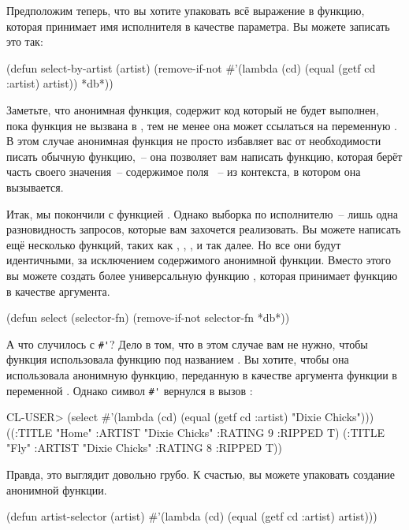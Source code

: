 Предположим теперь, что вы хотите упаковать всё выражение в функцию, которая принимает имя
исполнителя в качестве параметра. Вы можете записать это так:

\begin{myverb}
(defun select-by-artist (artist)
  (remove-if-not
   #'(lambda (cd) (equal (getf cd :artist) artist))
   *db*))
\end{myverb}

Заметьте, что анонимная функция, содержит код который не будет выполнен, пока функция не
вызвана в , тем не менее она может ссылаться на переменную
. В этом случае анонимная функция не просто избавляет вас от необходимости
писать обычную функцию,~-- она позволяет вам написать функцию, которая берёт часть своего
значения~-- содержимое поля ~-- из контекста, в котором она вызывается.

Итак, мы покончили с функцией . Однако выборка по исполнителю~--
лишь одна разновидность запросов, которые вам захочется реализовать. Вы можете написать
ещё несколько функций, таких как , ,
, и так далее. Но все они будут идентичными, за
исключением содержимого анонимной функции. Вместо этого вы можете создать более
универсальную функцию , которая принимает функцию в качестве аргумента.

\begin{myverb}
(defun select (selector-fn)
  (remove-if-not selector-fn *db*))
\end{myverb}

А что случилось с \lstinline!#'!? Дело в том, что в этом случае вам не нужно, чтобы функция
 использовала функцию под названием . Вы хотите,
чтобы она использовала анонимную функцию, переданную в качестве аргумента функции
 в переменной . Однако символ \lstinline!#'! вернулся в вызов
:

\begin{myverb}
  CL-USER> (select #'(lambda (cd) (equal (getf cd :artist) "Dixie Chicks")))
  ((:TITLE "Home" :ARTIST "Dixie Chicks" :RATING 9 :RIPPED T)
   (:TITLE "Fly" :ARTIST "Dixie Chicks" :RATING 8 :RIPPED T))
\end{myverb}

Правда, это выглядит довольно грубо. К счастью, вы можете упаковать создание анонимной функции.

\begin{myverb}
(defun artist-selector (artist)
  #'(lambda (cd) (equal (getf cd :artist) artist)))
\end{myverb}


